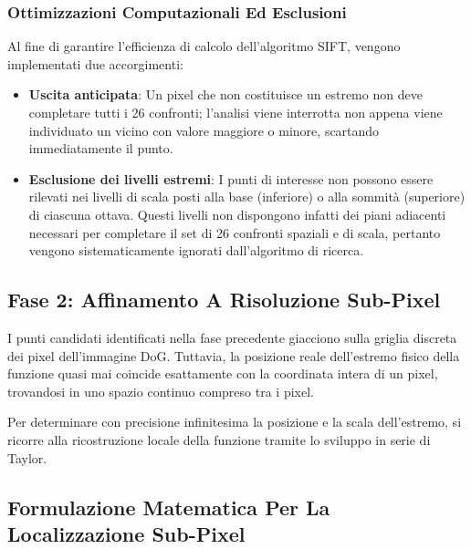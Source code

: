 ﻿\documentclass[11pt, a4paper]{article}
\begin{document}
\subsubsection{Ottimizzazioni Computazionali Ed Esclusioni}
Al fine di garantire l'efficienza di calcolo dell'algoritmo SIFT, vengono implementati due accorgimenti:
\begin{itemize}
    \item \textbf{Uscita anticipata}: Un pixel che non costituisce un estremo non deve completare tutti i 26 confronti; l'analisi viene interrotta non appena viene individuato un vicino con valore maggiore o minore, scartando immediatamente il punto.
    \item \textbf{Esclusione dei livelli estremi}: I punti di interesse non possono essere rilevati nei livelli di scala posti alla base (inferiore) o alla sommità (superiore) di ciascuna ottava. Questi livelli non dispongono infatti dei piani adiacenti necessari per completare il set di 26 confronti spaziali e di scala, pertanto vengono sistematicamente ignorati dall'algoritmo di ricerca.
\end{itemize}


\subsection{Fase 2: Affinamento A Risoluzione Sub-Pixel}

I punti candidati identificati nella fase precedente giacciono sulla griglia discreta dei pixel dell'immagine DoG. Tuttavia, la posizione reale dell'estremo fisico della funzione quasi mai coincide esattamente con la coordinata intera di un pixel, trovandosi in uno spazio continuo compreso tra i pixel.


Per determinare con precisione infinitesima la posizione e la scala dell'estremo, si ricorre alla ricostruzione locale della funzione tramite lo sviluppo in serie di Taylor.

\subsection{Formulazione Matematica Per La Localizzazione Sub-Pixel}
\end{document}
